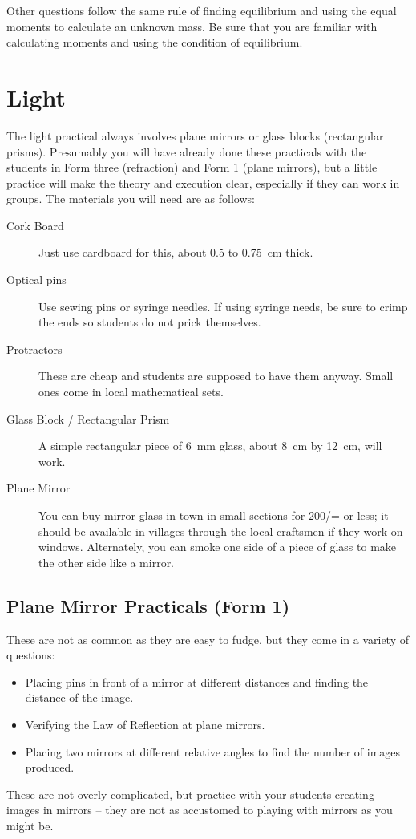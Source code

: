\documentclass[12pt,a4paper]{report}
\begin{document}
Other questions follow the same rule of finding equilibrium and using the equal
moments to calculate an unknown mass. Be sure that you are familiar with calculating
moments and using the condition of equilibrium.

\section{Light}
The light practical always involves plane mirrors or glass blocks (rectangular
prisms). Presumably you will have already done these practicals with the students in Form
three (refraction) and Form 1 (plane mirrors), but a little practice will make the theory and
execution clear, especially if they can work in groups. The materials you will need are as
follows:
\begin{description}
\item[Cork Board]{Just use cardboard for this, about 0.5 to 0.75~cm thick.}
\item[Optical pins]{Use sewing pins or syringe needles. If using syringe needs, be
sure to crimp the ends so students do not prick themselves.}
\item[Protractors]{These are cheap and students are supposed to have them anyway.
Small ones come in local mathematical sets.}
\item[Glass Block / Rectangular Prism]{A simple rectangular piece of 6~mm glass,
about 8~cm by 12~cm, will work.}
\item[Plane Mirror]{You can buy mirror glass in town in small sections for 200/= or
less; it should be available in villages through the local craftsmen if they work on
windows. Alternately, you can smoke one side of a piece of glass to make the
other side like a mirror.}
\end{description}

\subsection{Plane Mirror Practicals (Form 1)}

These are not as common as they are easy to fudge, but they come in a variety of
questions:
\begin{itemize}
\item{Placing pins in front of a mirror at different distances and finding the distance of
the image.}
\item{Verifying the Law of Reflection at plane mirrors.}
\item{Placing two mirrors at different relative angles to find the number of images
produced.}
\end{itemize}
These are not overly complicated, but practice with your students creating images in
mirrors -- they are not as accustomed to playing with mirrors as you might be.
\end{document}
